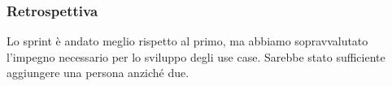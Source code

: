\subsubsection{Retrospettiva}
Lo sprint è andato meglio rispetto al primo, ma abbiamo sopravvalutato l'impegno necessario per lo sviluppo degli use case. Sarebbe stato sufficiente aggiungere una persona anziché due.